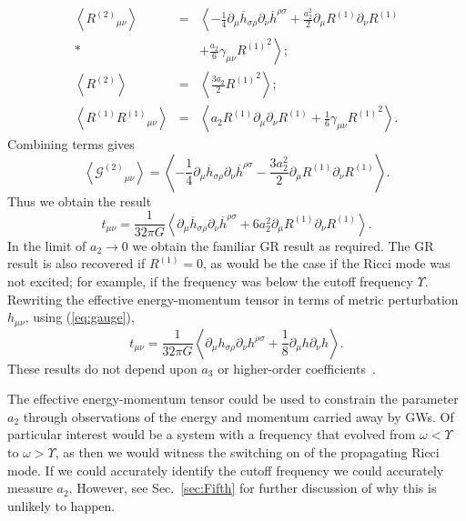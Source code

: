 \documentclass[aps,prd,amsfonts,amssymb,amsmath,nofootinbib,reprint,showpacs]{revtex4-1}
\newcommand{\eqnref}[1]{(\ref{eq:#1})}
\newcommand{\secref}[1]{Sec.\ \ref{sec:#1}}
\newcommand{\recip}[1]{\ensuremath{\frac{1}{#1}}}
\begin{document}
\begin{eqnarray}
\left\langle {R^{(2)}}_{\mu\nu} \right\rangle & = & \left\langle -\recip{4} \partial_\mu\overline{h}_{\sigma\rho}\partial_\nu\overline{h}^{\rho\sigma} + \frac{a_2^2}{2}\partial_\mu R^{(1)}\partial_\nu R^{(1)} \right. \nonumber \\* 
 & & + \left. \frac{a_2}{6}\gamma_{\mu\nu} {R^{(1)}}^2 \right\rangle; \\
\left\langle R^{(2)} \right\rangle & = & \left\langle \frac{3a_2}{2}{R^{(1)}}^2 \right\rangle; \\
\left\langle R^{(1)}{R^{(1)}}_{\mu\nu} \right\rangle & = & \left\langle a_2 R^{(1)} \partial_\mu\partial_\nu R^{(1)} + \recip{6}\gamma_{\mu\nu}{R^{(1)}}^2\right\rangle.
\end{eqnarray}
Combining terms gives
\begin{equation}
\left\langle {\mathcal{G}^{(2)}}_{\mu\nu}\right\rangle = \left\langle -\recip{4} \partial_\mu\overline{h}_{\sigma\rho}\partial_\nu\overline{h}^{\rho\sigma} - \frac{3a_2^2}{2}\partial_\mu R^{(1)}\partial_\nu R^{(1)} \right\rangle.
\end{equation}
Thus we obtain the result
\begin{equation}
t_{\mu\nu} = \recip{32\pi G}\left\langle \partial_\mu\overline{h}_{\sigma\rho}\partial_\nu\overline{h}^{\rho\sigma} + 6a_2^2\partial_\mu R^{(1)}\partial_\nu R^{(1)} \right\rangle.
\label{eq:Pseudotensor}
\end{equation}
In the limit of $a_2 \rightarrow 0$ we obtain the familiar GR result as required. The GR result is also recovered if $R^{(1)} = 0$, as would be the case if the Ricci mode was not excited; for example, if the frequency was below the cutoff frequency $\Upsilon$. Rewriting the effective energy-momentum tensor in terms of metric perturbation $h_{\mu\nu}$, using \eqnref{gauge},
\begin{equation}
t_{\mu\nu} = \recip{32\pi G}\left\langle \partial_\mu h_{\sigma\rho}\partial_\nu h^{\rho\sigma} + \recip{8}\partial_\mu h \partial_\nu h \right\rangle.
\end{equation}
These results do not depend upon $a_3$ or higher-order coefficients~\cite{Stein2011}.

The effective energy-momentum tensor could be used to constrain the parameter $a_2$ through observations of the energy and momentum carried away by GWs. Of particular interest would be a system with a frequency that evolved from $\omega < \Upsilon$ to $\omega > \Upsilon$, as then we would witness the switching on of the propagating Ricci mode. If we could accurately identify the cutoff frequency we could accurately measure $a_2$. However, see \secref{Fifth} for further discussion of why this is unlikely to happen.
\end{document}
